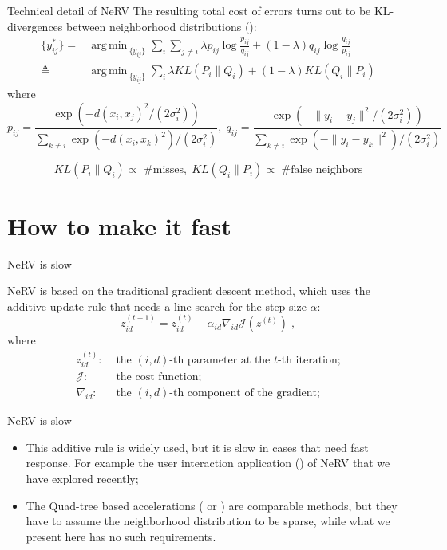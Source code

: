 \documentclass[first=dgreen,second=purple,logo=yellowexc]{aaltoslides}
\DeclareMathOperator*{\argmin}{arg\,min\,}
\begin{document}
\begin{frame}{Technical detail of NeRV}
The resulting total cost of errors turns out to be KL-divergences between neighborhood distributions (\cite{venna10jmlr}):
\begin{align*}
\{y^*_{ij}\}=&\argmin_{\{y_{ij}\}}\sum_i\sum_{j\ne i}\lambda p_{ij}\log\frac{p_{ij}}{q_{ij}}+(1-\lambda)q_{ij}\log\frac{q_{ij}}{p_{ij}}\\
\triangleq &\argmin_{\{y_{ij}\}}\sum_i\lambda KL(P_i\|Q_i)+(1-\lambda)KL(Q_i\|P_i)
\end{align*}
where
\[
p_{ij} = \frac{\exp(-d(x_i,x_j)^2/(2\sigma^2_i))}{\sum_{k\ne i} \exp(-d(x_i,x_k)^2)/(2\sigma^2_i)},\;
q_{ij} = \frac{\exp(-\|y_i-y_j\|^2/(2\sigma^2_i))}{\sum_{k\ne i} \exp(-\|y_i-y_k\|^2)/(2\sigma^2_i)}
\]

\[
KL(P_i\|Q_i)\propto \mbox{ \#misses},\;KL(Q_i\|P_i)\propto \mbox{ \#false neighbors}
\]

\end{frame}


\section{How to make it fast}
\begin{frame}{NeRV is slow}

NeRV is based on the traditional gradient descent method, which uses the additive update rule that needs a line search for the step size $\alpha$:
\[
z^{(t+1)}_{id}=z^{(t)}_{id}-\alpha_{id} \nabla_{id} \mathcal{J}(z^{(t)})\;,
\]
where
\begin{align*}
z^{(t)}_{id}:&\mbox{ the $(i,d)$-th parameter at the $t$-th iteration;}\\
\mathcal{J}:&\mbox{ the cost function;}\\
\nabla_{id}:&\mbox{ the $(i,d)$-th component of the gradient;}
\end{align*}
\end{frame}

\begin{frame}{NeRV is slow}
\begin{itemize}
\item This additive rule is widely used, but it is slow in cases that need fast response. For example the user interaction application (\cite{peltonen13eurovis}) of NeRV that we have explored recently;
\item The Quad-tree based accelerations (\cite{yang13icml} or \cite{vandermaaten13iclr}) are comparable methods, but they have to assume the neighborhood distribution to be sparse, while what we present here has no such requirements.
\end{itemize}
\end{frame}
\end{document}
